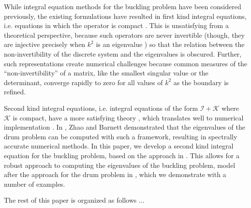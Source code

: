 While integral equation methods for the buckling problem
have been considered previously, the existing formulations
have resulted in first kind integral equations, i.e. equations
in which the operator is compact \cite{kitahara2014boundary,
  antunes2011buckling}. This is unsatisfying from a theoretical
perspective, because such operators are never invertible
(though, they are injective precisely when $k^2$ is an
eigenvalue \cite{kitahara2014boundary}) so that the
relation between the non-invertibility of the discrete system
and the eigenvalues is obscured. Further, such representations
create numerical challenges because common measures of the
``non-invertibility'' of a matrix, like the smallest singular
value or the determinant, converge rapidly to zero for all
values of $k^2$ as the boundary is refined.

Second kind integral equations, i.e. integral equations
of the form $\mathcal{I} + \mathcal{K}$ where $\mathcal{K}$
is compact, have a more satisfying theory
\cite{reed1972methods}, which translates
well to numerical implementation
\cite{bornemann2010numerical,zhao2015robust}.
In \cite{zhao2015robust}, Zhao and Barnett demonstrated
that the eigenvalues of the drum problem can be
computed with such a framework, resulting in
spectrally accurate numerical methods.
In this paper, we develop a second kind integral
equation for the buckling problem, based on the
approach in \cite{rachh2017integral}. This allows
for a robust approach to computing the eigenvalues
of the buckling problem, model after the approach for
the drum problem in \cite{zhao2015robust}, which we
demonstrate with a number of examples.

The rest of this paper is organized as follows ...

